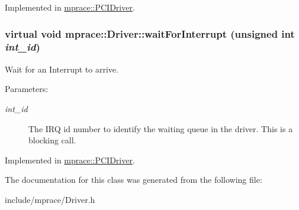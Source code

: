 Implemented in \hyperlink{classmprace_1_1PCIDriver_a5}{mprace::PCIDriver}.\hypertarget{classmprace_1_1Driver_a6}{
\subsubsection[waitForInterrupt]{\setlength{\rightskip}{0pt plus 5cm}virtual void mprace::Driver::wait\-For\-Interrupt (unsigned int {\em int\_\-id})}}
\label{classmprace_1_1Driver_a6}


Wait for an Interrupt to arrive. 

\begin{Desc}
\item[Parameters:]
\begin{description}
\item[{\em int\_\-id}]The IRQ id number to identify the waiting queue in the driver. This is a blocking call.\end{description}
\end{Desc}


Implemented in \hyperlink{classmprace_1_1PCIDriver_a9}{mprace::PCIDriver}.

The documentation for this class was generated from the following file:\begin{CompactItemize}
\item 
include/mprace/Driver.h\end{CompactItemize}
